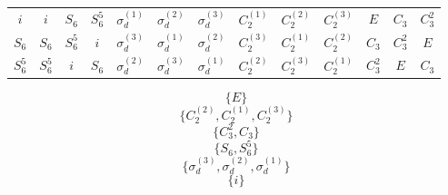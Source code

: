 \documentclass[a4paper,10pt]{article}
\begin{document}
\begin{table}[ht]
\begin{tabular} { |c|c c c c c c c c c c c c | }
$i$ & $i$ & $S_6$ & $S_6^5$ & $\sigma_d^{(1)}$ & $\sigma_d^{(2)}$ & $\sigma_d^{(3)}$ & $C_2^{(1)}$ & $C_2^{(2)}$ & $C_2^{(3)}$ & $E$ & $C_3$ & $C_3^2$ \\
$S_6$ & $S_6$ & $S_6^5$ & $i$ & $\sigma_d^{(3)}$ & $\sigma_d^{(1)}$ & $\sigma_d^{(2)}$ & $C_2^{(3)}$ & $C_2^{(1)}$ & $C_2^{(2)}$ & $C_3$ & $C_3^2$ & $E$ \\
$S_6^5$ & $S_6^5$ & $i$ & $S_6$ & $\sigma_d^{(2)}$ & $\sigma_d^{(3)}$ & $\sigma_d^{(1)}$ & $C_2^{(2)}$ & $C_2^{(3)}$ & $C_2^{(1)}$ & $C_3^2$ & $E$ & $C_3$ \\
\hline
\end{tabular}

\label{tab:mult_D3d}
\end{table}

$$
\{ E \}
$$
$$
\{ C_2^{(2)}, C_2^{(1)}, C_2^{(3)} \}
$$
$$
\{ C_3^2, C_3 \}
$$
$$
\{ S_6, S_6^5 \}
$$
$$
\{ \sigma_d^{(3)}, \sigma_d^{(2)}, \sigma_d^{(1)} \}
$$
$$
\{ i \}
$$
\end{document}
